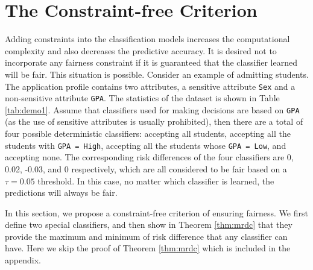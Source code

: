 \documentclass[letterpaper]{article} %
\begin{document}
\section{The Constraint-free Criterion}\label{sec:cfc}
Adding constraints into the classification models increases the computational complexity and also decreases the predictive accuracy. It is desired not to incorporate any fairness constraint if it is guaranteed that the classifier learned will be fair. This situation is possible. Consider an example of admitting students. The application profile contains two attributes, a sensitive attribute \texttt{Sex} and a non-sensitive attribute \texttt{GPA}. The statistics of the dataset is shown in Table \ref{tab:demo1}. Assume that classifiers used for making decisions are based on \texttt{GPA} (as the use of sensitive attributes is usually prohibited), then there are a total of four possible deterministic classifiers: accepting all students, accepting all the students with \texttt{GPA = High}, accepting all the students whose \texttt{GPA = Low}, and accepting none.  The corresponding risk differences of the four classifiers are 0, 0.02, -0.03, and 0 respectively, which are all considered to be fair based on a $\tau=0.05$ threshold. In this case, no matter which classifier is learned, the predictions will always be fair.


In this section, we propose a constraint-free criterion of ensuring fairness. We first define two special classifiers, and then show in Theorem \ref{thm:mrdc} that they provide the maximum and minimum of risk difference that any classifier can have. Here we skip the proof of Theorem \ref{thm:mrdc} which is included in the appendix.
\end{document}
